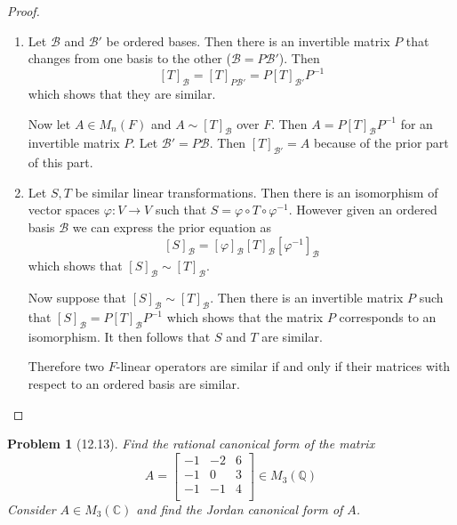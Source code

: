 \documentclass[10pt]{article}
\newcommand{\sk}{\vskip 10mm}
\newcommand{\bb}[1]{\mathbb{#1}}
\theoremstyle{plain}
\newtheorem{problem}{Problem}
\theoremstyle{remark}
\begin{document}
\begin{proof}
  \begin{enumerate}
  \item Let $\mathcal{B}$ and $\mathcal{B}'$ be ordered bases. Then there is
    an invertible matrix $P$ that changes from one basis to the other
    ($\mathcal{B}=P\mathcal{B}'$).
    Then
    \[[T]_{\mathcal{B}}=[T]_{P\mathcal{B}'}=P[T]_{\mathcal{B}'}P^{-1} \]
    which shows that they are similar.

    Now let $A\in M_n(F)$ and $A\sim [T]_{\mathcal{B}}$ over $F$. Then
    $A=P[T]_{\mathcal{B}}P^{-1}$ for an invertible matrix $P$. Let
    $\mathcal{B}'=P\mathcal{B}$. Then $[T]_{\mathcal{B}'}=A$ because of the prior
    part of this part.
  \item Let $S,T$ be similar linear transformations. Then there is an isomorphism
    of vector spaces $\varphi:V\rightarrow V$ such that $S=\varphi\circ T\circ\varphi^{-1}$. However given an ordered
    basis $\mathcal{B}$ we can express the prior equation as
    \[ [S]_{\mathcal{B}}=[\varphi]_{\mathcal{B}}[T]_{\mathcal{B}}[\varphi^{-1}]_{\mathcal{B}}\]
    which shows that $[S]_{\mathcal{B}}\sim[T]_{\mathcal{B}}$.

    Now suppose that $[S]_{\mathcal{B}}\sim[T]_{\mathcal{B}}$. Then there is an invertible
    matrix $P$ such that $[S]_{\mathcal{B}}=P[T]_{\mathcal{B}}P^{-1}$ which shows that
    the matrix $P$ corresponds to an isomorphism. It then follows that
    $S$ and $T$ are similar.

    Therefore two $F$-linear operators are similar if and only if their matrices
    with respect to an ordered basis are similar.
  \end{enumerate}
\end{proof}

\sk

\begin{problem}[12.13]
  Find the rational canonical form of the matrix
  \[
    A = 
    \left[
      \begin{array}{ccc}
        -1&-2&6\\
        -1&0&3\\
        -1&-1&4\\
      \end{array}
    \right] \in M_3(\bb{Q})
  \]
  Consider $A\in M_3(\bb{C})$ and find the Jordan canonical form of $A$.
\end{problem}
\end{document}
